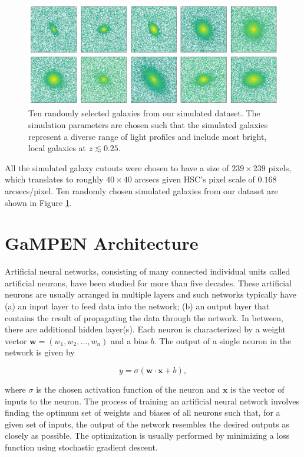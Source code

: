 \documentclass[twocolumn]{aastex63}
\newcommand\gampen{GaMPEN}
\begin{document}
\begin{CJK*}{UTF8}{gbsn}
\begin{figure}[htb]
    \centering
    \includegraphics[width
    =\textwidth]{random_sim_galaxies.png}
    \caption{Ten randomly selected galaxies from our simulated dataset. The simulation parameters are chosen such that the simulated galaxies represent a diverse range of light profiles and include most bright, local galaxies at $z \lesssim 0.25$.}
    \label{fig:random_sim_galaxies}
\end{figure}

All the simulated galaxy cutouts were chosen to have a size of $239 \times 239$ pixels, which translates to roughly $40 \times 40$ arcsecs given HSC's pixel scale of $0.168$ arcsecs/pixel. Ten randomly chosen simulated galaxies from our dataset are shown in Figure \ref{fig:random_sim_galaxies}. 


\section{\gampen{} Architecture} \label{sec:cnn_description}

Artificial neural networks, consisting of many connected individual units called artificial neurons, have been studied for more than five decades. These artificial neurons are usually arranged in multiple layers and such networks typically have (a) an input layer to feed data into the network; (b) an output layer that contains the result of propagating the data through the network. In between, there are additional hidden layer(s). Each neuron is characterized by a weight vector $\bm{w}=(w_1,w_2,\ldots,w_n)$ and a bias $b$. The output of a single neuron in the network is given by 

\begin{equation}
y = \sigma(\bm{w} \cdot \bm{x} + b) ,
\label{eq:neuron_output}
\end{equation}

\noindent
where $\sigma$ is the chosen activation function of the neuron and $\bm{x}$ is the vector of inputs to the neuron. 
The process of training an artificial neural network involves finding the optimum set of weights and biases of all neurons such that, for a given set of inputs, the output of the network resembles the desired outputs as closely as possible. The optimization is usually performed by minimizing a loss function using stochastic gradient descent.


\end{CJK*}
\end{document}
